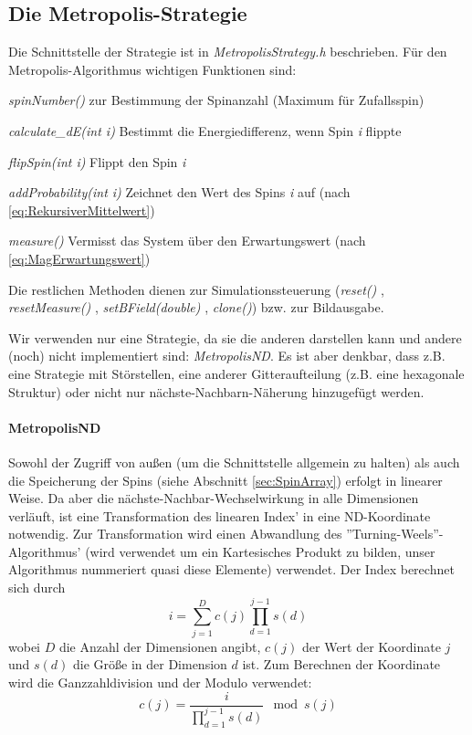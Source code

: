\subsection{Die Metropolis-Strategie}
Die Schnittstelle der Strategie ist in  \textit{MetropolisStrategy.h} beschrieben. Für den Metropolis-Algorithmus wichtigen Funktionen sind:
\begin{list}{}{}
\item  \textit{spinNumber()} zur Bestimmung der Spinanzahl (Maximum für Zufallsspin)
\item  \textit{calculate\_dE(int i)} Bestimmt die Energiedifferenz, wenn Spin \textit{i} flippte
\item  \textit{flipSpin(int i)} Flippt den Spin \textit{i}
\item  \textit{addProbability(int i)} Zeichnet den Wert des Spins \textit{i} auf (nach \eqref{eq:RekursiverMittelwert})
\item  \textit{measure()} Vermisst das System über den Erwartungswert (nach \eqref{eq:MagErwartungswert})
\end{list}
Die restlichen Methoden dienen zur Simulationssteuerung (\textit{reset()} , 
\textit{resetMeasure()} , 
\textit{setBField(double)} , 
\textit{clone()})  bzw. zur Bildausgabe. 

Wir verwenden nur eine Strategie, da sie die anderen darstellen kann und andere (noch) nicht implementiert sind: \textit{MetropolisND}. Es ist aber denkbar, dass z.B. eine Strategie mit Störstellen, eine anderer Gitteraufteilung (z.B. eine hexagonale Struktur) oder nicht nur nächste-Nachbarn-Näherung hinzugefügt werden.

\paragraph{MetropolisND}
Sowohl der Zugriff von außen (um die Schnittstelle allgemein zu halten) als auch die Speicherung der Spins (siehe Abschnitt \ref{sec:SpinArray}) erfolgt in linearer Weise. Da aber die nächste-Nachbar-Wechselwirkung in alle Dimensionen verläuft, ist eine Transformation des linearen Index' in eine ND-Koordinate notwendig. Zur Transformation wird einen Abwandlung des ''Turning-Weels''-Algorithmus' (wird verwendet um ein Kartesisches Produkt zu bilden, unser Algorithmus nummeriert quasi diese Elemente) verwendet. Der Index berechnet sich durch
\begin{equation}
i = \sum_{j=1}^D{ c(j)  \prod_{d=1}^{j-1} { s(d) }}
\end{equation}
wobei $D$ die Anzahl der Dimensionen angibt, $c(j)$ der Wert der Koordinate $j$ und $s(d)$ die Größe in der Dimension $d$ ist. 
Zum Berechnen der Koordinate wird die Ganzzahldivision und der Modulo verwendet:
\begin{equation}
c(j) = \frac{i}{\prod_{d=1}^{j-1} {s(d)} } \mod s(j) 
\end{equation}

